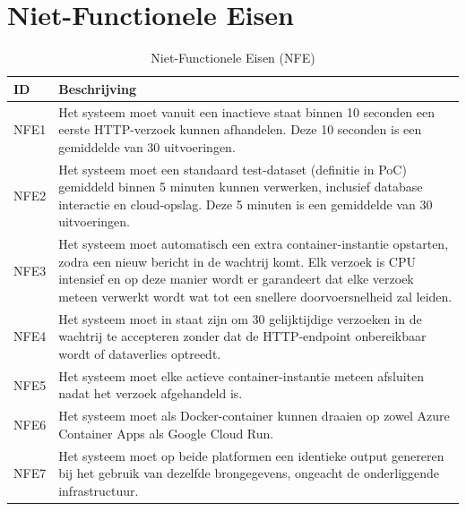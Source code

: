 \section{Niet-Functionele Eisen}
\begin{table}[H]
    \centering
    \caption{Niet-Functionele Eisen (NFE)}
    \label{tab:niet_functionele_eisen}
    \begin{tabular}{|l|p{15cm}|}
        \hline
        \textbf{ID} & \textbf{Beschrijving} \\ \hline
        NFE1 & Het systeem moet vanuit een inactieve staat binnen 10 seconden een eerste HTTP-verzoek kunnen afhandelen. Deze 10 seconden is een gemiddelde van 30 uitvoeringen. \\ \hline
        NFE2 & Het systeem moet een standaard test-dataset (definitie in PoC) gemiddeld binnen 5 minuten kunnen verwerken, inclusief database interactie en cloud-opslag. Deze 5 minuten is een gemiddelde van 30 uitvoeringen. \\ \hline
        NFE3 & Het systeem moet automatisch een extra container-instantie opstarten, zodra een nieuw bericht in de wachtrij komt. Elk verzoek is CPU intensief en op deze manier wordt er garandeert dat elke verzoek meteen verwerkt wordt wat tot een snellere doorvoersnelheid zal leiden.  \\ \hline
        NFE4 & Het systeem moet in staat zijn om 30 gelijktijdige verzoeken in de wachtrij te accepteren zonder dat de HTTP-endpoint onbereikbaar wordt of dataverlies optreedt. \\ \hline
        NFE5 & Het systeem moet elke actieve container-instantie meteen afsluiten nadat het verzoek afgehandeld is. \\ \hline
        NFE6 & Het systeem moet als Docker-container kunnen draaien op zowel Azure Container Apps als Google Cloud Run. \\ \hline
        NFE7 & Het systeem moet op beide platformen een identieke output genereren bij het gebruik van dezelfde brongegevens, ongeacht de onderliggende infrastructuur. \\ \hline
    \end{tabular}
\end{table}

